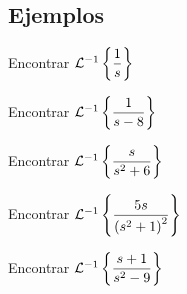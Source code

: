 \subsection{Ejemplos}


 \begin{resuelto}
  \label{bron:exmp:22.1}
  Encontrar $\mathcal{L}^{-1}\left\{ \dfrac{1}{s} \right\}$
 \end{resuelto}



 \begin{resuelto}
  \label{bron:exmp:22.2}
  Encontrar $\mathcal{L}^{-1}\left\{ \dfrac{1}{s-8} \right\}$
 \end{resuelto}




 \begin{resuelto}
  \label{bron:exmp:22.3}
  Encontrar $\mathcal{L}^{-1}\left\{ \dfrac{s}{s^{2}+6} \right\}$
 \end{resuelto}




 \begin{resuelto}
  \label{bron:exmp:22.4}
  Encontrar $\mathcal{L}^{-1}\left\{ \dfrac{5s}{\left( s^{2}+1 \right)^{2}} \right\}$
 \end{resuelto}



%
%
%


 \begin{resuelto}
  \label{bron:exmp:22.6}
  Encontrar $\mathcal{L}^{-1}\left\{ \dfrac{s+1}{s^{2}-9} \right\}$
 \end{resuelto}



